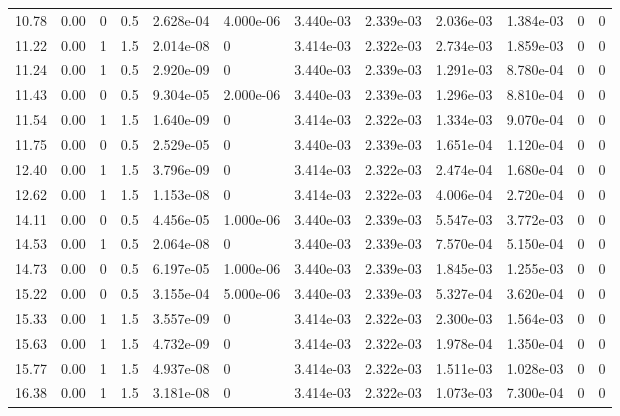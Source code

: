\documentclass[preview]{standalone}
\begin{document}
{{\begin{tabular}{L{1.2cm}C{1.2cm} C{0.3cm}C{0.5cm} C{1.4cm}C{1.4cm} C{1.4cm}C{1.4cm} C{1.6cm}C{1.6cm} C{1.6cm}C{1.6cm}}
  10.78  &  0.00  & 0     & 0.5 &  2.628e-04  & 4.000e-06  &  3.440e-03&   2.339e-03& 2.036e-03 & 1.384e-03   &  0 & 0  \\ 
  11.22  &  0.00  & 1     & 1.5 &  2.014e-08  & 0  &  3.414e-03&   2.322e-03& 2.734e-03 & 1.859e-03   &  0 & 0  \\ 
  11.24  &  0.00  & 1     & 0.5 &  2.920e-09  & 0  &  3.440e-03&   2.339e-03& 1.291e-03 & 8.780e-04   &  0 & 0  \\ 
  11.43  &  0.00  & 0     & 0.5 &  9.304e-05  & 2.000e-06  &  3.440e-03&   2.339e-03& 1.296e-03 & 8.810e-04   &  0 & 0  \\ 
  11.54  &  0.00  & 1     & 1.5 &  1.640e-09  & 0  &  3.414e-03&   2.322e-03& 1.334e-03 & 9.070e-04   &  0 & 0  \\ 
  11.75  &  0.00  & 0     & 0.5 &  2.529e-05  & 0  &  3.440e-03&   2.339e-03& 1.651e-04 & 1.120e-04   &  0 & 0  \\ 
  12.40  &  0.00  & 1     & 1.5 &  3.796e-09  & 0  &  3.414e-03&   2.322e-03& 2.474e-04 & 1.680e-04   &  0 & 0  \\ 
  12.62  &  0.00  & 1     & 1.5 &  1.153e-08  & 0  &  3.414e-03&   2.322e-03& 4.006e-04 & 2.720e-04   &  0 & 0  \\ 
  14.11  &  0.00  & 0     & 0.5 &  4.456e-05  & 1.000e-06  &  3.440e-03&   2.339e-03& 5.547e-03 & 3.772e-03   &  0 & 0  \\ 
  14.53  &  0.00  & 1     & 0.5 &  2.064e-08  & 0  &  3.440e-03&   2.339e-03& 7.570e-04 & 5.150e-04   &  0 & 0  \\ 
  14.73  &  0.00  & 0     & 0.5 &  6.197e-05  & 1.000e-06  &  3.440e-03&   2.339e-03& 1.845e-03 & 1.255e-03   &  0 & 0  \\ 
  15.22  &  0.00  & 0     & 0.5 &  3.155e-04  & 5.000e-06  &  3.440e-03&   2.339e-03& 5.327e-04 & 3.620e-04   &  0 & 0  \\ 
  15.33  &  0.00  & 1     & 1.5 &  3.557e-09  & 0  &  3.414e-03&   2.322e-03& 2.300e-03 & 1.564e-03   &  0 & 0  \\ 
  15.63  &  0.00  & 1     & 1.5 &  4.732e-09  & 0  &  3.414e-03&   2.322e-03& 1.978e-04 & 1.350e-04   &  0 & 0  \\ 
  15.77  &  0.00  & 1     & 1.5 &  4.937e-08  & 0  &  3.414e-03&   2.322e-03& 1.511e-03 & 1.028e-03   &  0 & 0  \\ 
  16.38  &  0.00  & 1     & 1.5 &  3.181e-08  & 0  &  3.414e-03&   2.322e-03& 1.073e-03 & 7.300e-04   &  0 & 0  \\ 
\hline 
\end{tabular} 

}}
\end{document}
